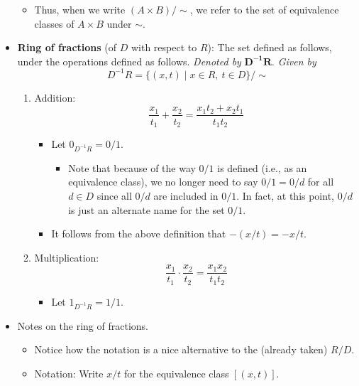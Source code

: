 \documentclass[../notes.tex]{subfiles}
\begin{document}
\begin{itemize}
\begin{itemize}
        \item Thus, when we write $(A\times B)/\sim$, we refer to the set of equivalence classes of $A\times B$ under $\sim$.
    \end{itemize}
    \item \textbf{Ring of fractions} (of $D$ with respect to $R$): The set defined as follows, under the operations defined as follows. \emph{Denoted by} $\bm{D^{-1}R}$. \emph{Given by}
    \begin{equation*}
        D^{-1}R = \{(x,t)\mid x\in R,\ t\in D\}/\sim
    \end{equation*}
    \begin{enumerate}
        \item Addition:
        \begin{equation*}
            \frac{x_1}{t_1}+\frac{x_2}{t_2} = \frac{x_1t_2+x_2t_1}{t_1t_2}
        \end{equation*}
        \begin{itemize}
            \item Let $0_{D^{-1}R}=0/1$.
            \begin{itemize}
                \item Note that because of the way $0/1$ is defined (i.e., as an equivalence class), we no longer need to say $0/1=0/d$ for all $d\in D$ since all $0/d$ are included in $0/1$. In fact, at this point, $0/d$ is just an alternate name for the set $0/1$.
            \end{itemize}
            \item It follows from the above definition that $-(x/t)=-x/t$.
        \end{itemize}
        \item Multiplication:
        \begin{equation*}
            \frac{x_1}{t_1}\cdot\frac{x_2}{t_2} = \frac{x_1x_2}{t_1t_2}
        \end{equation*}
        \begin{itemize}
            \item Let $1_{D^{-1}R}=1/1$.
        \end{itemize}
    \end{enumerate}
    \item Notes on the ring of fractions.
    \begin{itemize}
        \item Notice how the notation is a nice alternative to the (already taken) $R/D$.
        \item Notation: Write $x/t$ for the equivalence class $[(x,t)]$.

\end{itemize}
\end{itemize}
\end{document}
